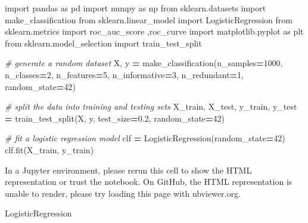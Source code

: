 \documentclass[
]{article}
\newenvironment{Shaded}{\begin{snugshade}}{\end{snugshade}}
\newcommand{\CommentTok}[1]{\textcolor[rgb]{0.56,0.35,0.01}{\textit{#1}}}
\newcommand{\DecValTok}[1]{\textcolor[rgb]{0.00,0.00,0.81}{#1}}
\newcommand{\FloatTok}[1]{\textcolor[rgb]{0.00,0.00,0.81}{#1}}
\newcommand{\ImportTok}[1]{#1}
\newcommand{\NormalTok}[1]{#1}
\newcommand{\OperatorTok}[1]{\textcolor[rgb]{0.81,0.36,0.00}{\textbf{#1}}}
\begin{document}
\begin{Shaded}
\begin{Highlighting}[]
\ImportTok{import}\NormalTok{ pandas }\ImportTok{as}\NormalTok{ pd}
\ImportTok{import}\NormalTok{ numpy }\ImportTok{as}\NormalTok{ np}
\ImportTok{from}\NormalTok{ sklearn.datasets }\ImportTok{import}\NormalTok{ make\_classification}
\ImportTok{from}\NormalTok{ sklearn.linear\_model }\ImportTok{import}\NormalTok{ LogisticRegression}
\ImportTok{from}\NormalTok{ sklearn.metrics }\ImportTok{import}\NormalTok{ roc\_auc\_score ,roc\_curve}
\ImportTok{import}\NormalTok{ matplotlib.pyplot }\ImportTok{as}\NormalTok{ plt}
\ImportTok{from}\NormalTok{ sklearn.model\_selection }\ImportTok{import}\NormalTok{ train\_test\_split}


\CommentTok{\# generate a random dataset}
\NormalTok{X, y }\OperatorTok{=}\NormalTok{ make\_classification(n\_samples}\OperatorTok{=}\DecValTok{1000}\NormalTok{, n\_classes}\OperatorTok{=}\DecValTok{2}\NormalTok{, n\_features}\OperatorTok{=}\DecValTok{5}\NormalTok{,}
\NormalTok{                            n\_informative}\OperatorTok{=}\DecValTok{3}\NormalTok{, n\_redundant}\OperatorTok{=}\DecValTok{1}\NormalTok{, random\_state}\OperatorTok{=}\DecValTok{42}\NormalTok{)}

\CommentTok{\# split the data into training and testing sets}
\NormalTok{X\_train, X\_test, y\_train, y\_test }\OperatorTok{=}\NormalTok{ train\_test\_split(X, y, test\_size}\OperatorTok{=}\FloatTok{0.2}\NormalTok{, random\_state}\OperatorTok{=}\DecValTok{42}\NormalTok{)}

\CommentTok{\# fit a logistic regression model}
\NormalTok{clf }\OperatorTok{=}\NormalTok{ LogisticRegression(random\_state}\OperatorTok{=}\DecValTok{42}\NormalTok{)}
\NormalTok{clf.fit(X\_train, y\_train)}

\end{Highlighting}
\end{Shaded}

\hypertarget{sk-container-id-1}{}
In a Jupyter environment, please rerun this cell to show the HTML
representation or trust the notebook. On GitHub, the HTML representation
is unable to render, please try loading this page with nbviewer.org.

LogisticRegression
\end{document}
